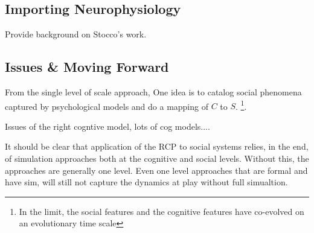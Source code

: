 \documentclass{article}
\begin{document}
\subsection{Importing Neurophysiology}
Provide background on Stocco's work.

\subsection{Issues \& Moving Forward}
From the single level of scale approach, One idea is to catalog social phenomena captured by psychological models and do a mapping of $C$ to $S$. \footnote{In the limit, the social features and the cognitive features have co-evolved on an evolutionary time scale}.

Issues of the right cogntive model, lots of cog models....

It should be clear that application of the RCP to social systems relies, in the end, of simulation approaches both at the cognitive and social levels.  Without this, the approaches are generally one level.  Even one level approaches that are formal and have sim, will still not capture the dynamics at play without full simualtion.  






\end{document}
